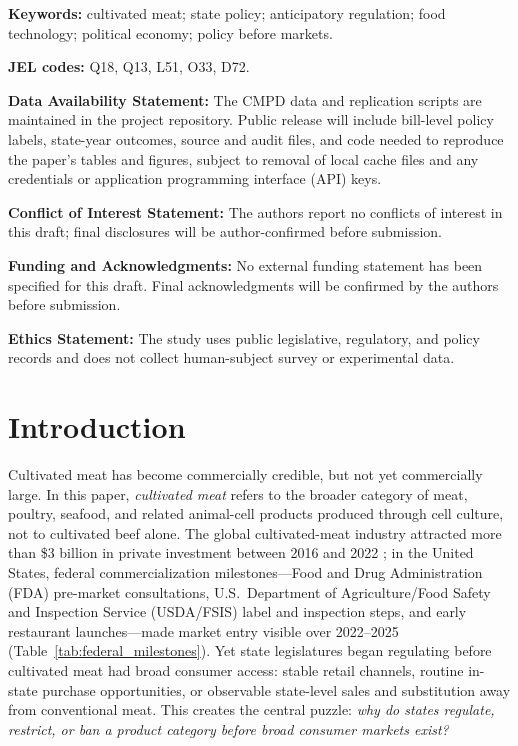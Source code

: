 \documentclass[12pt]{article}
\begin{document}
\noindent\textbf{Keywords:} cultivated meat; state policy; anticipatory regulation; food technology; political economy; policy before markets.

\noindent\textbf{JEL codes:} Q18, Q13, L51, O33, D72.

\bigskip
\noindent\textbf{Data Availability Statement:} The CMPD data and replication scripts are maintained in the project repository. Public release will include bill-level policy labels, state-year outcomes, source and audit files, and code needed to reproduce the paper's tables and figures, subject to removal of local cache files and any credentials or application programming interface (API) keys.

\noindent\textbf{Conflict of Interest Statement:} The authors report no conflicts of interest in this draft; final disclosures will be author-confirmed before submission.

\noindent\textbf{Funding and Acknowledgments:} No external funding statement has been specified for this draft. Final acknowledgments will be confirmed by the authors before submission.

\noindent\textbf{Ethics Statement:} The study uses public legislative, regulatory, and policy records and does not collect human-subject survey or experimental data.

\section{Introduction}

Cultivated meat has become commercially credible, but not yet commercially large.  In this paper, \emph{cultivated meat} refers to the broader category of meat, poultry, seafood, and related animal-cell products produced through cell culture, not to cultivated beef alone.  The global cultivated-meat industry attracted more than \$3 billion in private investment between 2016 and 2022 \citep{gfi2023state}; in the United States, federal commercialization milestones---Food and Drug Administration (FDA) pre-market consultations, U.S.\ Department of Agriculture/Food Safety and Inspection Service (USDA/FSIS) label and inspection steps, and early restaurant launches---made market entry visible over 2022--2025 (Table~\ref{tab:federal_milestones}).  Yet state legislatures began regulating before cultivated meat had broad consumer access: stable retail channels, routine in-state purchase opportunities, or observable state-level sales and substitution away from conventional meat.  This creates the central puzzle: \emph{why do states regulate, restrict, or ban a product category before broad consumer markets exist?}
\end{document}
